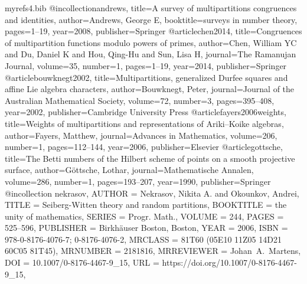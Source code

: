 \documentclass[11pt]{amsart}
\theoremstyle{plain}
\numberwithin{equation}{section}
\begin{document}
\begin{filecontents}{myrefs4.bib}
		@incollection{andrews,
			title={A survey of multipartitions congruences and identities},
			author={Andrews, George E},
			booktitle={surveys in number theory},
			pages={1--19},
			year={2008},
			publisher={Springer}
		}
		@article{chen2014,
			title={Congruences of multipartition functions modulo powers of primes},
			author={Chen, William YC and Du, Daniel K and Hou, Qing-Hu and Sun, Lisa H},
			journal={The Ramanujan Journal},
			volume={35},
			number={1},
			pages={1--19},
			year={2014},
			publisher={Springer}
		}
		@article{bouwknegt2002,
			title={Multipartitions, generalized {D}urfee squares and affine {L}ie algebra characters},
			author={Bouwknegt, Peter},
			journal={Journal of the Australian Mathematical Society},
			volume={72},
			number={3},
			pages={395--408},
			year={2002},
			publisher={Cambridge University Press}
		}
		@article{fayers2006weights,
			title={Weights of multipartitions and representations of {A}riki--{K}oike algebras},
			author={Fayers, Matthew},
			journal={Advances in Mathematics},
			volume={206},
			number={1},
			pages={112--144},
			year={2006},
			publisher={Elsevier}
		}
		@article{gottsche,
			title={The {B}etti numbers of the {H}ilbert scheme of points on a smooth projective surface},
			author={G{\"o}ttsche, Lothar},
			journal={Mathematische Annalen},
			volume={286},
			number={1},
			pages={193--207},
			year={1990},
			publisher={Springer}
		}
		@incollection {nekrasov,
			AUTHOR = {Nekrasov, Nikita A. and Okounkov, Andrei},
			TITLE = {Seiberg-{W}itten theory and random partitions},
			BOOKTITLE = {the unity of mathematics},
			SERIES = {Progr. Math.},
			VOLUME = {244},
			PAGES = {525--596},
			PUBLISHER = {Birkh\"auser Boston, Boston},
			YEAR = {2006},
			ISBN = {978-0-8176-4076-7; 0-8176-4076-2},
			MRCLASS = {81T60 (05E10 11Z05 14D21 60C05 81T45)},
			MRNUMBER = {2181816},
			MRREVIEWER = {Johan\ A.\ Martens},
			DOI = {10.1007/0-8176-4467-9\_15},
			URL = {https://doi.org/10.1007/0-8176-4467-9_15},
		}
	\end{filecontents}
	
				
\end{document}
